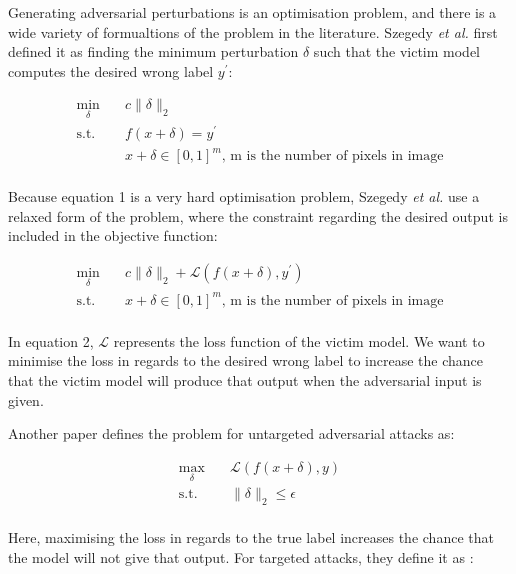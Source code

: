 Generating adversarial perturbations is an optimisation problem, and there is a wide variety of formualtions of the problem in the literature. Szegedy \textit{et al.} \cite{szegedy2014intriguing} first defined it as finding the minimum perturbation $\delta$ such that the victim model computes the desired wrong label $y^\prime$:

\begin{equation}
\begin{aligned}
\min_{\delta} \quad & c\|\delta\|_2\\
\textrm{s.t.} \quad & f(x + \delta) = y^\prime\\
  &x + \delta \in [0,1]^m \textrm{, m is the number of pixels in image}   \\
\end{aligned}
\end{equation}

Because equation 1 is a very hard optimisation problem, Szegedy \textit{et al.} \cite{szegedy2014intriguing} use a relaxed form of the problem, where the constraint regarding the desired output is included in the objective function:

\begin{equation}
\begin{aligned}
\min_{\delta} \quad & c\|\delta\|_2 + \mathcal{L}(f(x + \delta), y^\prime)\\
\textrm{s.t.} \quad& x + \delta \in [0,1]^m \textrm{, m is the number of pixels in image}   \\
\end{aligned}
\end{equation}

In equation 2, $\mathcal{L}$ represents the loss function of the victim model. We want to minimise the loss in regards to the desired wrong label to increase the chance that the victim model will produce that output when the adversarial input is given.

Another paper \cite{silva_survey} defines the problem for untargeted adversarial attacks as:

\begin{equation}
\begin{aligned}
\max_{\delta} \quad & \mathcal{L}(f(x + \delta), y)\\
\textrm{s.t.} \quad& \|\delta\|_2\leq\epsilon   \\
\end{aligned}
\end{equation}

Here, maximising the loss in regards to the true label increases the chance that the model will not give that output. For targeted attacks, they define it as :


